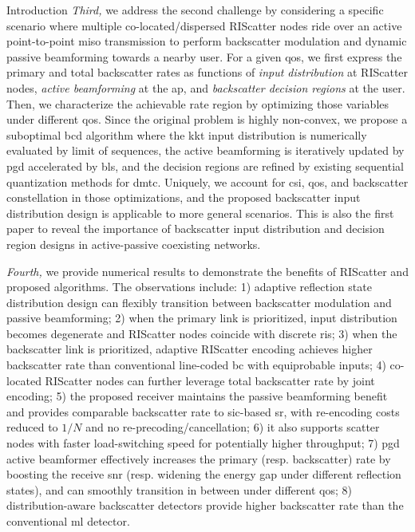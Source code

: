 \documentclass[journal,12pt,onecolumn,draftclsnofoot]{IEEEtran}
\theoremstyle{remark}
\begin{document}
\begin{section}{Introduction}
	\emph{Third,} we address the second challenge by considering a specific scenario where multiple co-located/dispersed RIScatter nodes ride over an active point-to-point \gls{miso} transmission to perform backscatter modulation and dynamic passive beamforming towards a nearby user.
	For a given \gls{qos}, we first express the primary and total backscatter rates as functions of \emph{input distribution} at RIScatter nodes, \emph{active beamforming} at the \gls{ap}, and \emph{backscatter decision regions} at the user.
	Then, we characterize the achievable rate region by optimizing those variables under different \gls{qos}.
	Since the original problem is highly non-convex, we propose a suboptimal \gls{bcd} algorithm where the \gls{kkt} input distribution is numerically evaluated by limit of sequences, the active beamforming is iteratively updated by \gls{pgd} accelerated by \gls{bls}, and the decision regions are refined by existing sequential quantization methods for \gls{dmtc}.
	Uniquely, we account for \gls{csi}, \gls{qos}, and backscatter constellation in those optimizations, and the proposed backscatter input distribution design is applicable to more general scenarios.
	This is also the first paper to reveal the importance of backscatter input distribution and decision region designs in active-passive coexisting networks.

	\emph{Fourth,} we provide numerical results to demonstrate the benefits of RIScatter and proposed algorithms.
	The observations include:
	1) adaptive reflection state distribution design can flexibly transition between backscatter modulation and passive beamforming;
	2) when the primary link is prioritized, input distribution becomes degenerate and RIScatter nodes coincide with discrete \gls{ris};
	3) when the backscatter link is prioritized, adaptive RIScatter encoding achieves higher backscatter rate than conventional line-coded \gls{bc} with equiprobable inputs;
	4) co-located RIScatter nodes can further leverage total backscatter rate by joint encoding;
	5) the proposed receiver maintains the passive beamforming benefit and provides comparable backscatter rate to \gls{sic}-based \gls{sr}, with re-encoding costs reduced to $1/N$ and no re-precoding/cancellation;
	6) it also supports scatter nodes with faster load-switching speed for potentially higher throughput;
	7) \gls{pgd} active beamformer effectively increases the primary (resp. backscatter) rate by boosting the receive \gls{snr} (resp. widening the energy gap under different reflection states), and can smoothly transition in between under different \gls{qos};
	8) distribution-aware backscatter detectors provide higher backscatter rate than the conventional \gls{ml} detector.


\end{section}
\end{document}
